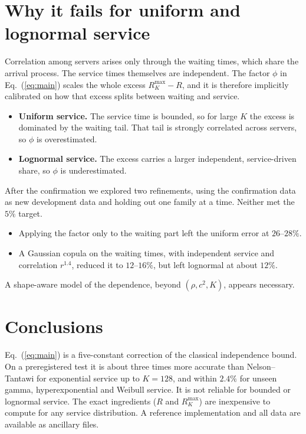 \documentclass[11pt]{article}
\begin{document}
\section{Why it fails for uniform and lognormal service}

Correlation among servers arises only through the waiting times, which share the arrival process. The service times
themselves are independent. The factor $\phi$ in Eq.~(\ref{eq:main}) scales the whole excess $R^{\max}_K-R$, and it is
therefore implicitly calibrated on how that excess splits between waiting and service.
\begin{itemize}
\item \textbf{Uniform service.} The service time is bounded, so for large $K$ the excess is dominated by the waiting
tail. That tail is strongly correlated across servers, so $\phi$ is overestimated.
\item \textbf{Lognormal service.} The excess carries a larger independent, service-driven share, so $\phi$ is
underestimated.
\end{itemize}
After the confirmation we explored two refinements, using the confirmation data as new development data and holding
out one family at a time. Neither met the $5\%$ target.
\begin{itemize}
\item Applying the factor only to the waiting part left the uniform error at $26$--$28\%$.
\item A Gaussian copula on the waiting times, with independent service and correlation $r^{1.4}$, reduced it to
$12$--$16\%$, but left lognormal at about $12\%$.
\end{itemize}
A shape-aware model of the dependence, beyond $(\rho,c^2,K)$, appears necessary.

\section{Conclusions}

Eq.~(\ref{eq:main}) is a five-constant correction of the classical independence bound. On a preregistered test it is
about three times more accurate than Nelson--Tantawi for exponential service up to $K=128$, and within $2.4\%$ for
unseen gamma, hyperexponential and Weibull service. It is not reliable for bounded or lognormal service. The exact
ingredients ($R$ and $R^{\max}_K$) are inexpensive to compute for any service distribution. A reference
implementation and all data are available as ancillary files.
\end{document}
